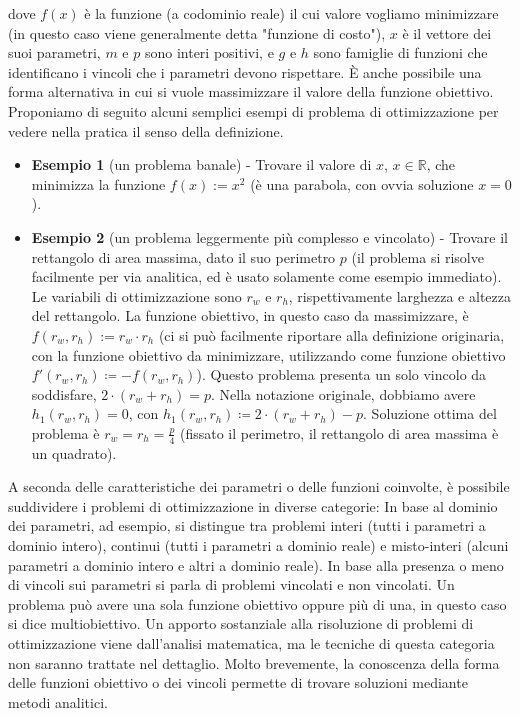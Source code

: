 \documentclass[12pt]{article}
\begin{document}
dove $f(x)$ è la funzione (a codominio reale) il cui valore vogliamo minimizzare (in questo caso viene generalmente detta "funzione di costo"), $x$ è il vettore dei suoi parametri, $m$ e $p$ sono interi positivi, e $g$ e $h$ sono famiglie di funzioni che identificano i vincoli che i parametri devono rispettare.
È anche possibile una forma alternativa in cui si vuole massimizzare il valore della funzione obiettivo.\newline
\newline
Proponiamo di seguito alcuni semplici esempi di problema di ottimizzazione per vedere nella pratica il senso della definizione.
\begin{itemize}
\item \textbf{Esempio 1} (un problema banale) - Trovare il valore di $x$, $x\in \mathbb{R}$, che minimizza la funzione $f(x) := x^2$ (è una parabola, con ovvia soluzione $x = 0$).

\item \textbf{Esempio 2} (un problema leggermente più complesso e vincolato) - Trovare il rettangolo di area massima, dato il suo perimetro $p$ (il problema si risolve facilmente per via analitica, ed è usato solamente come esempio immediato). Le variabili di ottimizzazione sono $r_w$ e $r_h$, rispettivamente larghezza e altezza del rettangolo. La funzione obiettivo, in questo caso da massimizzare, è $f(r_w, r_h) := r_w \cdot r_h$ (ci si può facilmente riportare alla definizione originaria, con la funzione obiettivo da minimizzare, utilizzando come funzione obiettivo $f'(r_w, r_h) \coloneqq -f(r_w, r_h)$). Questo problema presenta un solo vincolo da soddisfare, $2 \cdot (r_w+r_h) = p$. Nella notazione originale, dobbiamo avere $h_1(r_w, r_h) = 0$, con $h_1(r_w, r_h) \coloneqq 2 \cdot (r_w+r_h)-p$. Soluzione ottima del problema è $r_w = r_h = \frac{p}{4}$ (fissato il perimetro, il rettangolo di area massima è un quadrato).
\end{itemize}

A seconda delle caratteristiche dei parametri o delle funzioni coinvolte, è possibile suddividere i problemi di ottimizzazione in diverse categorie: In base al dominio dei parametri, ad esempio, si distingue tra problemi interi (tutti i parametri a dominio intero), continui (tutti i parametri a dominio reale) e misto-interi (alcuni parametri a dominio intero e altri a dominio reale).\newline
In base alla presenza o meno di vincoli sui parametri si parla di problemi vincolati e non vincolati. Un problema può avere una sola funzione obiettivo oppure più di una, in questo caso si dice multiobiettivo. \newline
\newline
Un apporto sostanziale alla risoluzione di problemi di ottimizzazione viene dall'analisi matematica, ma le tecniche di questa categoria non saranno trattate nel dettaglio. Molto brevemente, la conoscenza della forma delle funzioni obiettivo o dei vincoli permette di trovare soluzioni mediante metodi analitici.\newline
\end{document}

